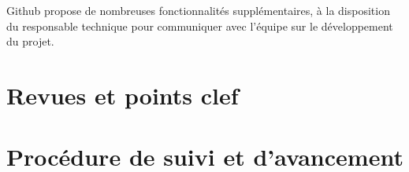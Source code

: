 \documentclass{../../res/univ-projet}
\begin{document}
Github propose de nombreuses fonctionnalités supplémentaires, à la disposition du responsable technique pour communiquer avec l'équipe sur le développement du projet.

\newpage
\section{Revues et points clef}

\section{Procédure de suivi et d'avancement}
\end{document}
